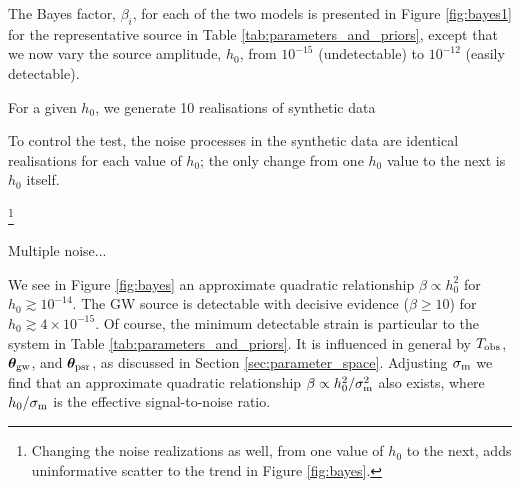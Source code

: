 \documentclass[fleqn,usenatbib,useAMS]{mnras}
\begin{document}
	
The Bayes factor, $\beta_i$, for each of the two models is presented in Figure \ref{fig:bayes1} for the representative source in Table \ref{tab:parameters_and_priors}, except that we now vary the source amplitude, $h_0$, from $10^{-15}$ (undetectable) to $10^{-12}$ (easily detectable). 





For a given $h_0$, we generate 10 realisations of synthetic data




To control the test, the noise processes in the synthetic data are identical realisations for each value of $h_0$; the only change from one $h_0$ value to the next is $h_0$ itself. 







\footnote{Changing the noise realizations as well, from one value of $h_0$ to the next, adds uninformative scatter to the trend in Figure \ref{fig:bayes}.}
	
	
	
	
	Multiple noise...
	
	
	
	
		
		
		We see in Figure \ref{fig:bayes} an approximate quadratic relationship $\beta \propto h_0^2$ for $h_0 \gtrsim 10^{-14}$. The GW source is detectable with decisive evidence ($\beta \geq 10$) for $h_0 \gtrsim 4 \times 10^{-15}$. Of course, the minimum detectable strain is particular to the system in Table \ref{tab:parameters_and_priors}. It is influenced in general by $T_{\rm obs}$, ${\boldsymbol{\theta}}_{\rm gw}$, and ${\boldsymbol{\theta}}_{\rm psr}$, as discussed in Section \ref{sec:parameter_space}. Adjusting $\sigma_{\rm m}$ we find that an approximate quadratic relationship $\beta \propto h_0^2 / \sigma_{\rm m}^2$ also exists, where $h_0 / \sigma_{\rm m}$ is the effective signal-to-noise ratio. \newline 
		
		
%		
%		
%		
		
\end{document}
